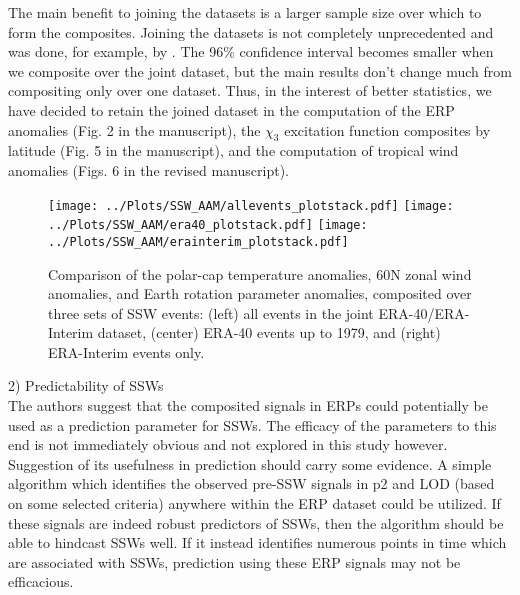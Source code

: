 \documentclass[a4paper,10pt]{article}
\begin{document}
The main benefit to joining the datasets is a larger sample size over which to form the composites.  
Joining the datasets is not completely unprecedented and was done, for example, by \cite{blumeetal2012}.
The 96\% confidence interval becomes smaller when we composite over the joint dataset, but the main results don't change much from compositing only over one dataset.
Thus, in the interest of better statistics, we have decided to retain the joined dataset in the computation of the ERP anomalies (Fig. 2 in the manuscript), the $\chi_3$ excitation function composites by latitude (Fig. 5 in the manuscript), and the computation of tropical wind anomalies (Figs. 6 in the revised manuscript).  

\vspace{0.5cm}

\begin{figure}
  \noindent
  \texttt{[image: ../Plots/SSW\_AAM/allevents\_plotstack.pdf]}
  \texttt{[image: ../Plots/SSW\_AAM/era40\_plotstack.pdf]}
  \texttt{[image: ../Plots/SSW\_AAM/erainterim\_plotstack.pdf]}
   \caption{Comparison of the polar-cap temperature anomalies, 60N zonal wind anomalies, and Earth rotation parameter anomalies, composited over three sets of SSW events: (left) all events in the joint ERA-40/ERA-Interim dataset, (center) ERA-40 events up to 1979, and (right) ERA-Interim events only.}
   \label{fig:summary_plotstack_datasets}
 \end{figure}


\noindent \textcolor{reviewer}{2) Predictability of SSWs  \\
The authors suggest that the composited signals in ERPs could potentially be used as a prediction parameter for SSWs. The efficacy of the parameters to this end is not immediately obvious and not explored in this study however. Suggestion of its usefulness in prediction should carry some evidence. A simple algorithm which identifies the observed pre-SSW signals in p2 and LOD (based on some selected criteria) anywhere within the ERP dataset could be utilized. If these signals are indeed robust predictors of SSWs, then the algorithm should be able to hindcast SSWs well. If it instead identifies numerous points in time which are associated with SSWs, prediction using these ERP signals may not be efficacious.}
\vspace{0.5cm}
\end{document}
